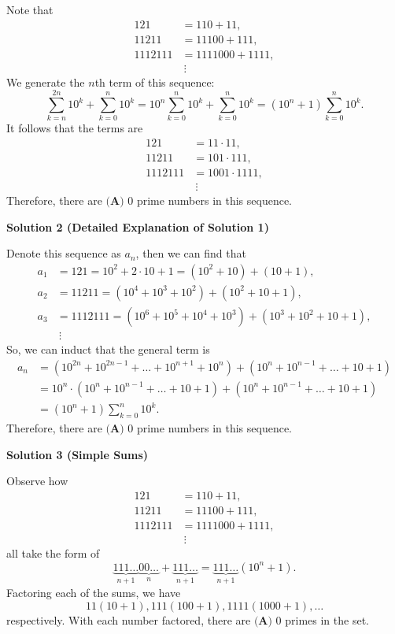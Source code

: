 \begin{enumerate}
Note that
 \begin{align*} 121 &= 110 + 11, \\ 11211 &= 11100 + 111, \\ 1112111 &= 1111000 + 1111, \\ & \ \vdots \end{align*}
We generate the $n$th term of this sequence:
 \[\sum_{k=n}^{2n}10^k + \sum_{k=0}^{n}10^k = 10^n\sum_{k=0}^{n}10^k + \sum_{k=0}^{n}10^k = \left(10^n+1\right)\sum_{k=0}^{n}10^k.\]It follows that the terms are
 \begin{align*} 121 &= 11\cdot11, \\ 11211 &= 101\cdot111, \\ 1112111 &= 1001\cdot1111, \\ & \ \vdots \end{align*}
Therefore, there are $\boxed{\textbf{(A) } 0}$ prime numbers in this sequence.

 



\textbf{Solution 2 (Detailed Explanation of Solution 1)}

Denote this sequence as $a_{n}$, then we can find that
 \begin{align*} a_{1} &= 121 = 10^2 + 2\cdot10 + 1 = (10^2 + 10) + (10 + 1), \\ a_{2} &= 11211 = (10^4 + 10^3 + 10^2) + (10^2 + 10 + 1), \\ a_{3} &= 1112111 = (10^6 + 10^5 + 10^4 + 10^3) + (10^3 + 10^2 + 10 + 1), \\ & \ \vdots \end{align*}
So, we can induct that the general term is
 \begin{align*} a_n &= (10^{2n} + 10^{2n-1} + \ldots + 10^{n+1} + 10^n) + (10^n + 10^{n-1} + \ldots +10 + 1) \\ &= 10^n\cdot(10^n + 10^{n-1} + \ldots +10 + 1) + (10^n + 10^{n-1} + \ldots +10 + 1) \\ &= \left(10^n+1\right)\sum_{k=0}^{n}10^k. \end{align*}
Therefore, there are $\boxed{\textbf{(A) } 0}$ prime numbers in this sequence.

 



\textbf{Solution 3 (Simple Sums)}

Observe how 
 \begin{align*} 121 &= 110 + 11, \\ 11211 &= 11100 + 111, \\ 1112111 &= 1111000 + 1111, \\ & \ \vdots \end{align*}
all take the form of 
 \[\underbrace{111\ldots}_{n+1}\underbrace{00\ldots}_{n} + \underbrace{111\ldots}_{n+1} = \underbrace{111\ldots}_{n+1}(10^{n} + 1).\]Factoring each of the sums, we have 
 \[11(10+1), 111(100+1), 1111(1000+1), \ldots\] respectively. With each number factored, there are $\boxed{\textbf{(A) } 0}$ primes in the set.


\end{enumerate}

